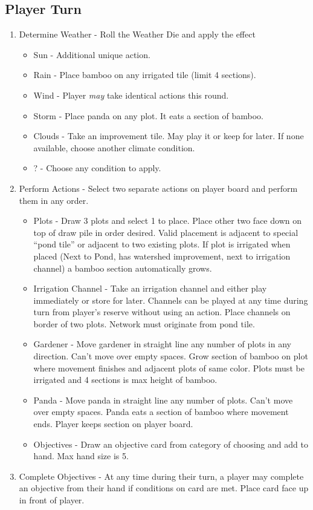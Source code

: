 \documentclass[12pt]{article}
\newenvironment{enumerateCustom}
{\begin{enumerate}
  \setlength{\itemsep}{1pt}
  \setlength{\parskip}{0pt}
  \setlength{\parsep}{0pt}}
{\end{enumerate}}
\newenvironment{itemizeCustom}
{\begin{itemize}
  \setlength{\itemsep}{1pt}
  \setlength{\parskip}{0pt}
  \setlength{\parsep}{0pt}}
{\end{itemize}}
\begin{document}
\begin{mdframed}[style = customFrame]
\begin{multicols*}{2}
\section*{Player Turn}
\begin{enumerateCustom}
	\item Determine Weather - Roll the Weather Die and apply the effect
		\begin{itemizeCustom}
			\item Sun - Additional unique action.
			\item Rain - Place bamboo on any irrigated tile (limit 4 sections).
			\item Wind - Player \emph{may} take identical actions this round.
			\item Storm - Place panda on any plot. It eats a section of bamboo.
			\item Clouds - Take an improvement tile. May play it or keep for later. If none available, choose another climate condition.
			\item ? - Choose any condition to apply.
		\end{itemizeCustom}
	\item Perform Actions - Select two separate actions on player board and perform them in any order.
		\begin{itemizeCustom}
			\item Plots - Draw 3 plots and select 1 to place. Place other two face down on top of draw pile in order desired. Valid placement is adjacent to special ``pond tile'' or adjacent to two existing plots. If plot is irrigated when placed (Next to Pond, has watershed improvement, next to irrigation channel) a bamboo section automatically grows.
			\item Irrigation Channel - Take an irrigation channel and either play immediately or store for later. Channels can be played at any time during turn from player's reserve without using an action. Place channels on border of two plots. Network must originate from pond tile.
			\item Gardener - Move gardener in straight line any number of plots in any direction. Can't move over empty spaces. Grow section of bamboo on plot where movement finishes and adjacent plots of same color. Plots must be irrigated and 4 sections is max height of bamboo.
			\item Panda - Move panda in straight line any number of plots. Can't move over empty spaces. Panda eats a section of bamboo where movement ends. Player keeps section on player board.
			\item Objectives - Draw an objective card from category of choosing and add to hand. Max hand size is 5.
		\end{itemizeCustom}
	\item Complete Objectives - At any time during their turn, a player may complete an objective from their hand if conditions on card are met. Place card face up in front of player.
\end{enumerateCustom}


\end{multicols*}
\end{mdframed}
\end{document}
